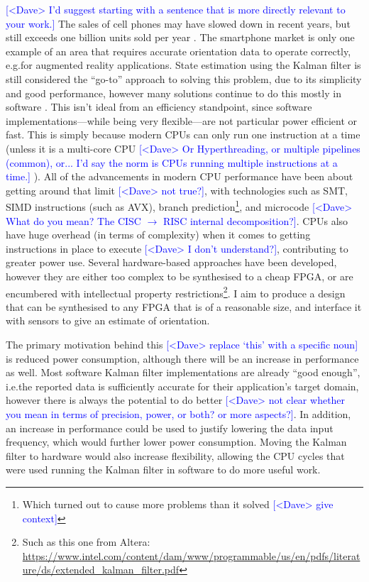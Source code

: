 \documentclass[12pt]{article}
\newcommand{\note}[2][red]{\textcolor{#1}{#2}}
\newcommand{\notedme}[1]{\note[blue]{[<Dave> #1]}}
\begin{document}
\notedme{I'd suggest starting with a sentence that is more directly relevant to your work.}
The sales of cell phones may have slowed down in recent years, but still exceeds one billion units sold per year \cite{Mongardini_2020}. The smartphone market is only one example of an area that requires accurate orientation data to operate correctly, e.g.\@ for augmented reality applications. State estimation using the Kalman filter is still considered the ``go-to'' approach to solving this problem, due to its simplicity and good performance, however many solutions continue to do this mostly in software \cite{ayub_2012}. This isn't ideal from an efficiency standpoint, since software implementations---while being very flexible---are not particular power efficient or fast. This is simply because modern CPUs can only run one instruction at a time (unless it is a multi-core CPU \notedme{Or Hyperthreading, or multiple pipelines (common), or... I'd say the norm is CPUs running multiple instructions at a time.} ). All of the advancements in modern CPU performance have been about getting around that limit \notedme{not true?}, with technologies such as SMT, SIMD instructions (such as AVX), branch prediction\footnote{Which turned out to cause more problems than it solved \notedme{give context}}, and microcode \notedme{What do you mean? The CISC $\to$ RISC internal decomposition?}. CPUs also have huge overhead (in terms of complexity) when it comes to getting instructions in place to execute \notedme{I don't understand?}, contributing to greater power use. Several hardware-based approaches have been developed, however they are either too complex \cite{mills_2016} to be synthesised to a cheap FPGA, or are encumbered with intellectual property restrictions\footnote{Such as this one from Altera: \url{https://www.intel.com/content/dam/www/programmable/us/en/pdfs/literature/ds/extended_kalman_filter.pdf}}. I aim to produce a design that can be synthesised to any FPGA that is of a reasonable size, and interface it with sensors to give an estimate of orientation.

The primary motivation behind this \notedme{replace `this' with a specific noun} is reduced power consumption, although there will be an increase in performance as well. Most software Kalman filter implementations are already ``good enough'', i.e.\@ the reported data is sufficiently accurate for their application's target domain, however there is always the potential to do better \notedme{not clear whether you mean in terms of precision, power, or both? or more aspects?}. In addition, an increase in performance could be used to justify lowering the data input frequency, which would further lower power consumption. Moving the Kalman filter to hardware would also increase flexibility, allowing the CPU cycles that were used running the Kalman filter in software to do more useful work.
\end{document}
